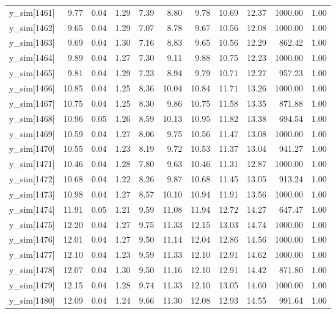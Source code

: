 \begin{table}[ht]
\begin{tabular}{rrrrrrrrrrr}
  y\_sim[1461] & 9.77 & 0.04 & 1.29 & 7.39 & 8.80 & 9.78 & 10.69 & 12.37 & 1000.00 & 1.00 \\ 
  y\_sim[1462] & 9.65 & 0.04 & 1.29 & 7.07 & 8.78 & 9.67 & 10.56 & 12.08 & 1000.00 & 1.00 \\ 
  y\_sim[1463] & 9.69 & 0.04 & 1.30 & 7.16 & 8.83 & 9.65 & 10.56 & 12.29 & 862.42 & 1.00 \\ 
  y\_sim[1464] & 9.89 & 0.04 & 1.27 & 7.30 & 9.11 & 9.88 & 10.75 & 12.23 & 1000.00 & 1.00 \\ 
  y\_sim[1465] & 9.81 & 0.04 & 1.29 & 7.23 & 8.94 & 9.79 & 10.71 & 12.27 & 957.23 & 1.00 \\ 
  y\_sim[1466] & 10.85 & 0.04 & 1.25 & 8.36 & 10.04 & 10.84 & 11.71 & 13.26 & 1000.00 & 1.00 \\ 
  y\_sim[1467] & 10.75 & 0.04 & 1.25 & 8.30 & 9.86 & 10.75 & 11.58 & 13.35 & 871.88 & 1.00 \\ 
  y\_sim[1468] & 10.96 & 0.05 & 1.26 & 8.59 & 10.13 & 10.95 & 11.82 & 13.38 & 694.54 & 1.00 \\ 
  y\_sim[1469] & 10.59 & 0.04 & 1.27 & 8.06 & 9.75 & 10.56 & 11.47 & 13.08 & 1000.00 & 1.00 \\ 
  y\_sim[1470] & 10.55 & 0.04 & 1.23 & 8.19 & 9.72 & 10.53 & 11.37 & 13.04 & 941.27 & 1.00 \\ 
  y\_sim[1471] & 10.46 & 0.04 & 1.28 & 7.80 & 9.63 & 10.46 & 11.31 & 12.87 & 1000.00 & 1.00 \\ 
  y\_sim[1472] & 10.68 & 0.04 & 1.22 & 8.26 & 9.87 & 10.68 & 11.45 & 13.05 & 913.24 & 1.00 \\ 
  y\_sim[1473] & 10.98 & 0.04 & 1.27 & 8.57 & 10.10 & 10.94 & 11.91 & 13.56 & 1000.00 & 1.00 \\ 
  y\_sim[1474] & 11.91 & 0.05 & 1.21 & 9.59 & 11.08 & 11.94 & 12.72 & 14.27 & 647.47 & 1.00 \\ 
  y\_sim[1475] & 12.20 & 0.04 & 1.27 & 9.75 & 11.33 & 12.15 & 13.03 & 14.74 & 1000.00 & 1.00 \\ 
  y\_sim[1476] & 12.01 & 0.04 & 1.27 & 9.50 & 11.14 & 12.04 & 12.86 & 14.56 & 1000.00 & 1.00 \\ 
  y\_sim[1477] & 12.10 & 0.04 & 1.23 & 9.59 & 11.33 & 12.10 & 12.91 & 14.62 & 1000.00 & 1.00 \\ 
  y\_sim[1478] & 12.07 & 0.04 & 1.30 & 9.50 & 11.16 & 12.10 & 12.91 & 14.42 & 871.80 & 1.00 \\ 
  y\_sim[1479] & 12.15 & 0.04 & 1.28 & 9.74 & 11.33 & 12.10 & 13.05 & 14.60 & 1000.00 & 1.00 \\ 
  y\_sim[1480] & 12.09 & 0.04 & 1.24 & 9.66 & 11.30 & 12.08 & 12.93 & 14.55 & 991.64 & 1.00 \\ 

\end{tabular}
\end{table}
